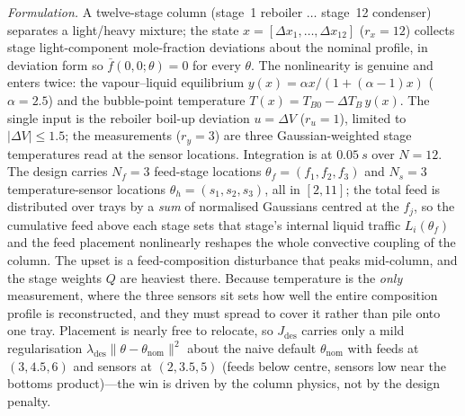 \documentclass[twocolumn,amsthm]{autart}
\begin{document}
\emph{Formulation.} A twelve-stage column (stage~1 reboiler
$\dots$ stage~12 condenser) separates a light/heavy mixture; the state
$x=[\Delta x_1,\dots,\Delta x_{12}]$ ($r_x=12$) collects stage light-component
mole-fraction deviations about the nominal profile, in deviation form so
$\bar f(0,0;\theta)=0$ for every $\theta$. The nonlinearity is genuine and
enters twice: the vapour--liquid equilibrium
$y(x)=\alpha x/(1+(\alpha-1)x)$ ($\alpha=2.5$) and the bubble-point temperature
$T(x)=T_{B0}-\Delta T_B\,y(x)$. The single input is the reboiler boil-up
deviation $u=\Delta V$ ($r_u=1$), limited to $|\Delta V|\le1.5$; the measurements
($r_y=3$) are three Gaussian-weighted stage temperatures read at the sensor
locations. Integration is at $\SI{0.05}{s}$ over $N=12$. The design carries
$N_f=3$ feed-stage locations $\theta_f=(f_1,f_2,f_3)$ and $N_s=3$
temperature-sensor locations $\theta_h=(s_1,s_2,s_3)$, all in $[2,11]$; the total
feed is distributed over trays by a \emph{sum} of normalised Gaussians centred at
the $f_j$, so the cumulative feed above each stage sets that stage's internal
liquid traffic $L_i(\theta_f)$ and the feed placement nonlinearly reshapes the
whole convective coupling of the column. The upset is a feed-composition
disturbance that peaks mid-column, and the stage weights $Q$ are heaviest there.
Because temperature is the \emph{only} measurement, where the three sensors sit
sets how well the entire composition profile is reconstructed, and they must spread
to cover it rather than pile onto one tray. Placement is nearly free to relocate,
so $J_{\mathrm{des}}$ carries only a mild regularisation
$\lambda_{\mathrm{des}}\lVert\theta-\theta_{\mathrm{nom}}\rVert^2$ about the naive
default $\theta_{\mathrm{nom}}$ with feeds at $(3,4.5,6)$ and sensors at
$(2,3.5,5)$ (feeds below centre, sensors low near the bottoms product)---the win is
driven by the column physics, not by the design penalty.
\end{document}
